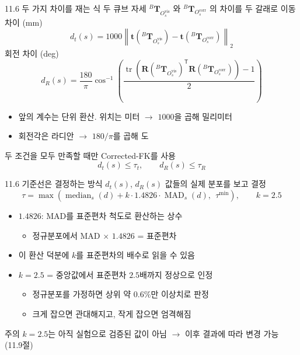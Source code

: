 \documentclass[aspectratio=169,11pt]{beamer}
\newcommand{\T}[3][]{{}^{#2}\mathbf{T}^{#1}_{#3}}   %
\newcommand{\Ovis}{O^{\mathrm{vis}}}   %
\newcommand{\Ocorr}{O^{\mathrm{corr}}} %
\begin{document}
\begin{frame}{11.6 두 가지 차이를 재는 식}
  두 큐브 자세 $\T{B}{\Ovis_s}$ 와 $\T{B}{\Ocorr_s}$ 의 차이를 두 갈래로
  \vfill
  이동 차이 (mm)
  \[
    d_t(s)
    =
    1000
    \left\|
      \mathbf{t}\!\left(\T{B}{\Ovis_s}\right)
      -
      \mathbf{t}\!\left(\T{B}{\Ocorr_s}\right)
    \right\|_2
  \]
  회전 차이 (deg)
  \[
    d_R(s)
    =
    \frac{180}{\pi}
    \cos^{-1}
    \left(
      \frac{
        \operatorname{tr}
        \left(
          \mathbf{R}\!\left(\T{B}{\Ovis_s}\right)^{\mathsf T}
          \mathbf{R}\!\left(\T{B}{\Ocorr_s}\right)
        \right)-1
      }{2}
    \right)
  \]
  \begin{itemize}
    \item 앞의 계수는 단위 환산. 위치는 미터 $\rightarrow$ $1000$을 곱해 밀리미터
    \item 회전각은 라디안 $\rightarrow$ $180/\pi$를 곱해 도
  \end{itemize}
  \vfill
  두 조건을 모두 만족할 때만 Corrected-FK를 사용
  \[
    d_t(s)\leq \tau_t,
    \qquad
    d_R(s)\leq \tau_R
  \]
\end{frame}

\begin{frame}{11.6 기준선은 결정하는 방식}
  $d_t(s)$, $d_R(s)$ 값들의 실제 분포를 보고 결정
  \[
    \tau
    =
    \max\left(
      \operatorname{median}_s(d)
      + k \cdot 1.4826 \cdot \operatorname{MAD}_s(d),
      \ \ \tau^{\min}
    \right),
    \qquad
    k=2.5
  \]
  \vfill
  \begin{itemize}
    \item $1.4826$: MAD를 표준편차 척도로 환산하는 상수
      \begin{itemize}
        \item 정규분포에서 MAD $\times$ $1.4826$ = 표준편차
      \end{itemize}
    \item 이 환산 덕분에 $k$를 표준편차의 배수로 읽을 수 있음
    \item $k=2.5$ = 중앙값에서 표준편차 $2.5$배까지 정상으로 인정
      \begin{itemize}
        \item 정규분포를 가정하면 상위 약 $0.6\%$만 이상치로 판정
        \item 크게 잡으면 관대해지고, 작게 잡으면 엄격해짐
      \end{itemize}
  \end{itemize}
  \vfill
  \begin{alertblock}{주의}
    $k=2.5$는 아직 실험으로 검증된 값이 아님
    $\rightarrow$ 이후 결과에 따라 변경 가능 (11.9절)
  \end{alertblock}
\end{frame}
\end{document}
